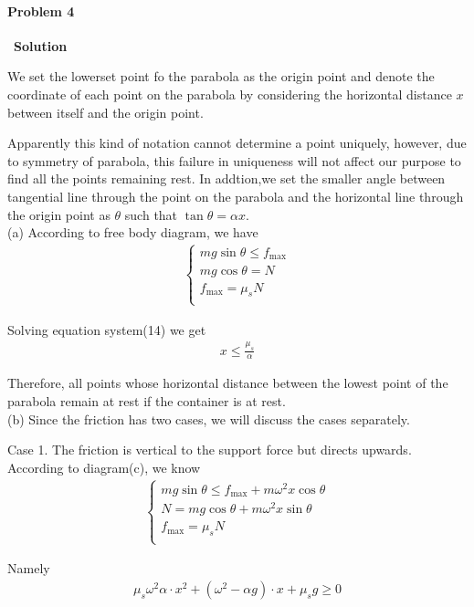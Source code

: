 \documentclass[12pt,a4paper]{article}
\begin{document}
\paragraph{\large \textbf{Problem 4}}~{\textbf{Solution}}
\vspace{2mm}
\par We set the lowerset point fo the parabola as the origin point and denote the coordinate of each point on the parabola by considering the horizontal distance $x$ between itself and the origin point.
\par Apparently this kind of notation cannot determine a point uniquely, however, due to symmetry of parabola, this failure in uniqueness will not affect our purpose to find all the points remaining rest. In addtion,we set the smaller angle between tangential line through the point on the parabola and the horizontal line through the origin point as $\theta$ such that $\tan \theta = \alpha x$.\\
\newline
\noindent (a) According to free body diagram, we have
\begin{align}
	\left\{ \begin{array}{l}
		mg\sin\theta \leq f_{\max}\\
		mg\cos\theta=N\\
		f_{\max}=\mu_sN\\			
	\end{array} \right.	
\end{align}
\par Solving equation system(14) we get
\begin{align}
	x \leq \frac{\mu_s}{\alpha}
\end{align}
\par Therefore, all points whose horizontal distance between the lowest point of the parabola remain at rest if the container is at rest.\\
\newline
\noindent (b) Since the friction has two cases, we will discuss the cases separately.
\par Case 1. The friction is vertical to the support force but directs upwards. According to diagram(c), we know
\begin{align}
	\left\{ \begin{array}{l}
		mg\sin\theta \leq f_{\max}+m\omega^2 x\cos\theta\\
		N=mg\cos\theta+m\omega^2 x\sin\theta\\
		f_{\max}=\mu_s N\\			
	\end{array} \right.	
\end{align}
\par Namely
\begin{align}
	\mu_s\omega^2\alpha\cdot x^2 + (\omega^2-\alpha g)\cdot x +\mu_s g \geq 0
\end{align}
\end{document}
